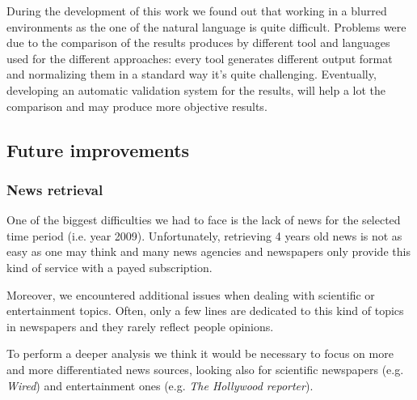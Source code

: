 During the development of this work we found out that working in a blurred environments as the one of the natural language is quite difficult.
Problems were due to the comparison of the results produces by different tool and languages used for the different approaches: every tool generates different output format and normalizing them in a standard way it's quite challenging. 
Eventually, developing an automatic validation system for the results, will help a lot the comparison and may produce more objective results.


\subsection*{Future improvements}
\subsubsection*{News retrieval}
One of the biggest difficulties we had to face is the lack of news for the
selected time period (i.e. year 2009). Unfortunately, retrieving 4 years old
news is not as easy as one may think and many news agencies and newspapers only
provide this kind of service with a payed subscription.

Moreover, we encountered additional issues when dealing with scientific or
entertainment topics. Often, only a few lines are dedicated to this kind of
topics in newspapers and they rarely reflect people opinions.

To perform a deeper analysis we think it would be necessary to focus on more and
more differentiated news sources, looking also for scientific newspapers (e.g.
\emph{Wired}) and entertainment ones (e.g. \emph{The Hollywood reporter}).

